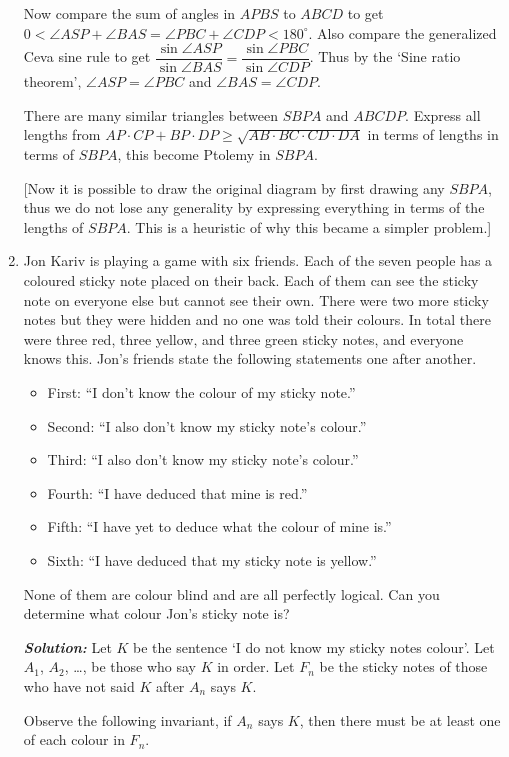 \documentclass[12pt]{article}
\newcommand{\sol}{\textbf{\textit{Solution: }}}
\begin{document}
\begin{enumerate}[topsep=\bigskipamount,itemsep=\bigskipamount,leftmargin=0pt]
Now compare the sum of angles in $APBS$ to $ABCD$ to get $0 < \angle ASP+\angle BAS=\angle PBC+\angle CDP < 180^\circ$.
Also compare the generalized Ceva sine rule to get $\dfrac{\sin \angle ASP}{\sin \angle BAS}=\dfrac{\sin\angle PBC}{\sin\angle CDP}$.
Thus by the `Sine ratio theorem', $\angle ASP=\angle PBC$ and $\angle BAS=\angle CDP$.

There are many similar triangles between $SBPA$ and $ABCDP$.
Express all lengths from
$AP\cdot CP+BP\cdot DP \geqslant \sqrt{AB\cdot BC\cdot CD\cdot DA}$
in terms of lengths in terms of $SBPA$,
this become Ptolemy in $SBPA$.

[Now it is possible to draw the original diagram by first drawing any $SBPA$,
thus we do not lose any generality by expressing everything in terms of the lengths of $SBPA$.
This is a heuristic of why this became a simpler problem.]
\item
Jon Kariv is playing a game with six friends. Each of the seven people has a coloured sticky note placed on their back. Each of them can see the sticky note on everyone else but cannot see their own. There were two more sticky notes but they were hidden and no one was told their colours. In total there were three red, three yellow, and three green sticky notes, and everyone knows this. Jon's friends state the following statements one after another.
\begin{itemize}
\item First: ``I don't know the colour of my sticky note.''
\item Second: ``I also don't know my sticky note's colour.''
\item Third: ``I also don't know my sticky note's colour.''
\item Fourth: ``I have deduced that mine is red.''
\item Fifth: ``I have yet to deduce what the colour of mine is.''
\item Sixth: ``I have deduced that my sticky note is yellow.''
\end{itemize}
None of them are colour blind and are all perfectly logical.
Can you determine what colour Jon's sticky note is?

\sol
Let $K$ be the sentence
`I do not know my sticky notes colour'.
Let $A_1$, $A_2$, \dots, be those who say $K$ in order.
Let $F_n$ be 
the sticky notes of those who have not said $K$ 
after $A_n$ says $K$.

Observe the following invariant,
if $A_n$ says $K$, 
then there must be at least one of each colour in $F_n$.


\end{enumerate}
\end{document}
